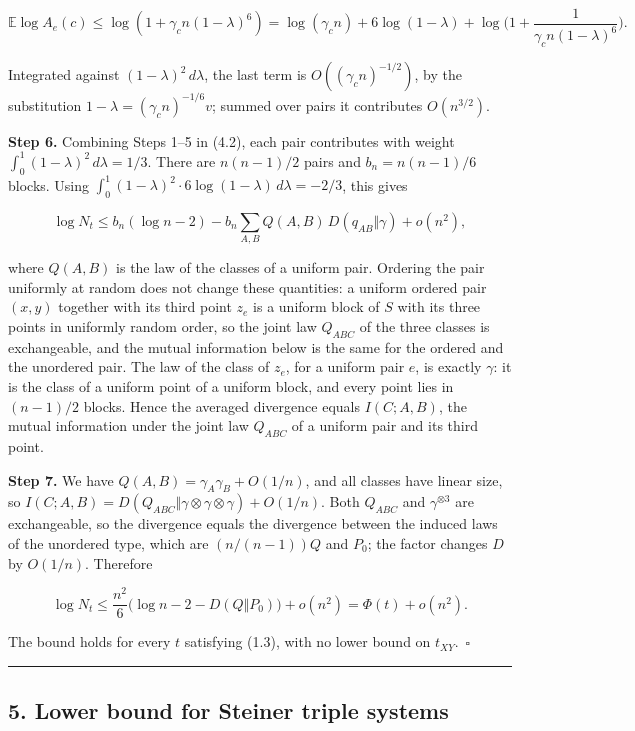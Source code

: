 \documentclass[english,11pt,a4paper]{article}
\begin{document}
\nopagebreak[4]
\[\mathbb E\log A_e(c)\le\log(1+\gamma_c n(1-\lambda)^6)=\log(\gamma_c n)+6\log(1-\lambda)+\log\Big(1+\frac{1}{\gamma_c n(1-\lambda)^6}\Big).\]

Integrated against \((1-\lambda)^2\,d\lambda\), the last term is \(O((\gamma_c n)^{-1/2})\), by the substitution \(1-\lambda=(\gamma_c n)^{-1/6}v\); summed over pairs it contributes \(O(n^{3/2})\).

\textbf{Step 6.} Combining Steps 1--5 in (4.2), each pair contributes with weight \(\int_0^1(1-\lambda)^2\,d\lambda=1/3\). There are \(n(n-1)/2\) pairs and \(b_n=n(n-1)/6\) blocks. Using \(\int_0^1(1-\lambda)^2\cdot6\log(1-\lambda)\,d\lambda=-2/3\), this gives

\nopagebreak[4]
\[\log N_t\le b_n(\log n-2)-b_n\sum_{A,B}Q(A,B)\,D(q_{AB}\Vert\gamma)+o(n^2),\]

where \(Q(A,B)\) is the law of the classes of a uniform pair. Ordering the pair uniformly at random does not change these quantities: a uniform ordered pair \((x,y)\) together with its third point \(z_e\) is a uniform block of \(S\) with its three points in uniformly random order, so the joint law \(Q_{ABC}\) of the three classes is exchangeable, and the mutual information below is the same for the ordered and the unordered pair. The law of the class of \(z_e\), for a uniform pair \(e\), is exactly \(\gamma\): it is the class of a uniform point of a uniform block, and every point lies in \((n-1)/2\) blocks. Hence the averaged divergence equals \(I(C;A,B)\), the mutual information under the joint law \(Q_{ABC}\) of a uniform pair and its third point.

\textbf{Step 7.} We have \(Q(A,B)=\gamma_A\gamma_B+O(1/n)\), and all classes have linear size, so \(I(C;A,B)=D(Q_{ABC}\Vert\gamma\otimes\gamma\otimes\gamma)+O(1/n)\). Both \(Q_{ABC}\) and \(\gamma^{\otimes3}\) are exchangeable, so the divergence equals the divergence between the induced laws of the unordered type, which are \((n/(n-1))Q\) and \(P_0\); the factor changes \(D\) by \(O(1/n)\). Therefore

\nopagebreak[4]
\[\log N_t\le\frac{n^2}{6}\big(\log n-2-D(Q\Vert P_0)\big)+o(n^2)=\Phi(t)+o(n^2).\tag{4.3}\]

The bound holds for every \(t\) satisfying (1.3), with no lower bound on \(t_{XY}\).~\(\square\)

\begin{center}\rule{0.5\linewidth}{0.5pt}\end{center}

\subsection{5. Lower bound for Steiner triple systems}\label{lower-bound-for-steiner-triple-systems}
\end{document}
